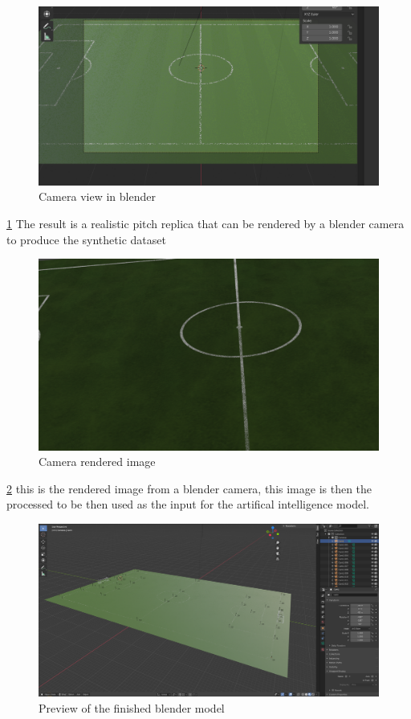\documentclass[
11pt,
twoside
]{report}
\begin{document}
\begin{figure}[H]
    \includegraphics[keepaspectratio, width=\columnwidth]{Screenshot_2021-12-17_19-08-06.png}
    \caption{Camera view in blender}
    \label{img:cam_grass}
\end{figure}
\ref{img:cam_grass} The result is a realistic pitch replica that can be rendered by a blender camera to produce the synthetic dataset
\begin{figure}[H]
    \includegraphics[keepaspectratio, width=\columnwidth]{image.png}
    \caption{Camera rendered image}
    \label{img:camera_view}
\end{figure}
\ref{img:camera_view} this is the rendered image from a blender camera, this image is then the processed to be then used as the input for the artifical intelligence model.
\begin{figure}[H]
    \includegraphics[keepaspectratio, width=\columnwidth]{Screenshot_2022-03-05_12-03-42.png}
    \caption{Preview of the finished blender model}
    \label{img:blender_preview}
\end{figure}
\end{document}
